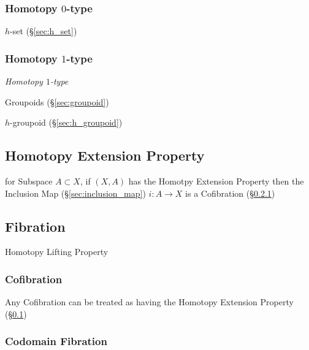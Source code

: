 \subsubsection{Homotopy $0$-type}\label{sec:homotopy_0type}

$h$-set (\S\ref{sec:h_set})



\subsubsection{Homotopy $1$-type}\label{sec:homotopy_1type}

\emph{Homotopy $1$-type}

Groupoids (\S\ref{sec:groupoid})

$h$-groupoid (\S\ref{sec:h_groupoid})



\subsection{Homotopy Extension Property}\label{sec:homotopy_extension}

for Subspace $A \subset X$, if $(X,A)$ has the Homotpy Extension
Property then the Inclusion Map (\S\ref{sec:inclusion_map}) $i : A
\rightarrow X$ is a Cofibration (\S\ref{sec:cofibration})



\subsection{Fibration}\label{sec:fibration}

Homotopy Lifting Property



\subsubsection{Cofibration}\label{sec:cofibration}

Any Cofibration can be treated as having the Homotopy Extension
Property (\S\ref{sec:homotopy_extension})



\subsubsection{Codomain Fibration}\label{sec:codomain_fibration}

